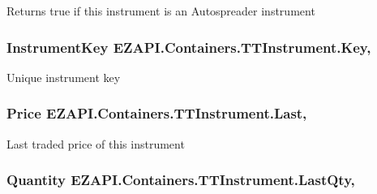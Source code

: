 Returns true if this instrument is an Autospreader instrument 

\hypertarget{class_e_z_a_p_i_1_1_containers_1_1_t_t_instrument_afd9710cbbcb94497b8aa7cfb392a27ac}{
\subsubsection[{Key}]{\setlength{\rightskip}{0pt plus 5cm}Instrument\-Key E\-Z\-A\-P\-I.\-Containers.\-T\-T\-Instrument.\-Key\hspace{0.3cm}{\ttfamily [get]}, {\ttfamily [set]}}}\label{class_e_z_a_p_i_1_1_containers_1_1_t_t_instrument_afd9710cbbcb94497b8aa7cfb392a27ac}


Unique instrument key 

\hypertarget{class_e_z_a_p_i_1_1_containers_1_1_t_t_instrument_aca64b41e159a6f32285ba63d20be77a1}{
\subsubsection[{Last}]{\setlength{\rightskip}{0pt plus 5cm}Price E\-Z\-A\-P\-I.\-Containers.\-T\-T\-Instrument.\-Last\hspace{0.3cm}{\ttfamily [get]}, {\ttfamily [set]}}}\label{class_e_z_a_p_i_1_1_containers_1_1_t_t_instrument_aca64b41e159a6f32285ba63d20be77a1}


Last traded price of this instrument 

\hypertarget{class_e_z_a_p_i_1_1_containers_1_1_t_t_instrument_aa8c0b55bf3f9321f09f10769a1b5fac3}{
\subsubsection[{Last\-Qty}]{\setlength{\rightskip}{0pt plus 5cm}Quantity E\-Z\-A\-P\-I.\-Containers.\-T\-T\-Instrument.\-Last\-Qty\hspace{0.3cm}{\ttfamily [get]}, {\ttfamily [set]}}}\label{class_e_z_a_p_i_1_1_containers_1_1_t_t_instrument_aa8c0b55bf3f9321f09f10769a1b5fac3}


